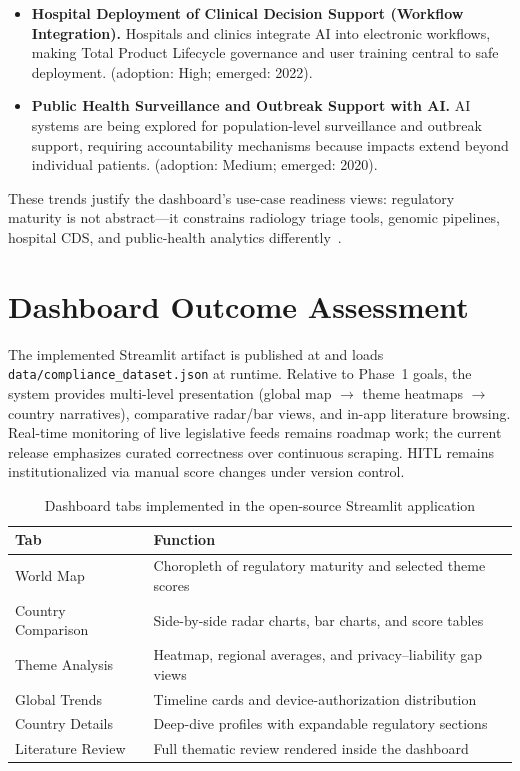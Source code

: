 \begin{itemize}[noitemsep]
  \item \textbf{Hospital Deployment of Clinical Decision Support (Workflow Integration).} Hospitals and clinics integrate AI into electronic workflows, making Total Product Lifecycle governance and user training central to safe deployment. (adoption: High; emerged: 2022).
  \item \textbf{Public Health Surveillance and Outbreak Support with AI.} AI systems are being explored for population-level surveillance and outbreak support, requiring accountability mechanisms because impacts extend beyond individual patients. (adoption: Medium; emerged: 2020).
\end{itemize}

These trends justify the dashboard's use-case readiness views: regulatory maturity is not abstract---it constrains radiology triage tools, genomic pipelines, hospital CDS, and public-health analytics differently~\cite{rajpurkar2022,hwang2019}.

\section{Dashboard Outcome Assessment}
\label{sec:dashresults}

The implemented Streamlit artifact is published at
\newline\noindent\repoLink{}
and loads \texttt{data/compliance\_dataset.json} at runtime. Relative to Phase~1 goals, the system provides multi-level presentation (global map $\rightarrow$ theme heatmaps $\rightarrow$ country narratives), comparative radar/bar views, and in-app literature browsing. Real-time monitoring of live legislative feeds remains roadmap work; the current release emphasizes curated correctness over continuous scraping. HITL remains institutionalized via manual score changes under version control.

\begin{table}[htbp]
\centering
\caption{Dashboard tabs implemented in the open-source Streamlit application}
\label{tab:dashtabs}
\begin{tabularx}{\textwidth}{@{}l X@{}}
\toprule
\textbf{Tab} & \textbf{Function} \\
\midrule
World Map & Choropleth of regulatory maturity and selected theme scores \\
Country Comparison & Side-by-side radar charts, bar charts, and score tables \\
Theme Analysis & Heatmap, regional averages, and privacy--liability gap views \\
Global Trends & Timeline cards and device-authorization distribution \\
Country Details & Deep-dive profiles with expandable regulatory sections \\
Literature Review & Full thematic review rendered inside the dashboard \\
\bottomrule
\end{tabularx}
\end{table}

